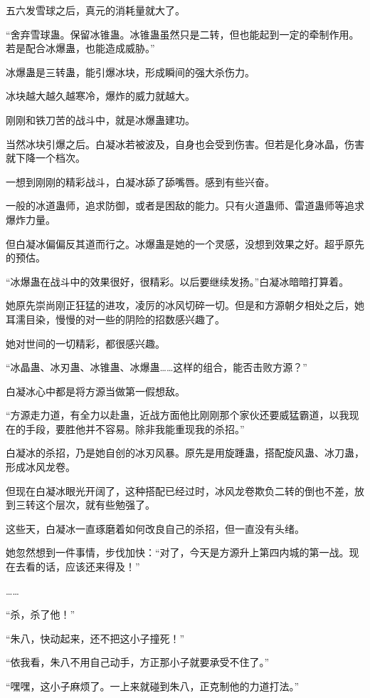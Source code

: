 \begin{this_body}
五六发雪球之后，真元的消耗量就大了。

“舍弃雪球蛊。保留冰锥蛊。冰锥蛊虽然只是二转，但也能起到一定的牵制作用。若是配合冰爆蛊，也能造成威胁。”

冰爆蛊是三转蛊，能引爆冰块，形成瞬间的强大杀伤力。

冰块越大越久越寒冷，爆炸的威力就越大。

刚刚和铁刀苦的战斗中，就是冰爆蛊建功。

当然冰块引爆之后。白凝冰若被波及，自身也会受到伤害。但若是化身冰晶，伤害就下降一个档次。

一想到刚刚的精彩战斗，白凝冰舔了舔嘴唇。感到有些兴奋。

一般的冰道蛊师，追求防御，或者是困敌的能力。只有火道蛊师、雷道蛊师等追求爆炸力量。

但白凝冰偏偏反其道而行之。冰爆蛊是她的一个灵感，没想到效果之好。超乎原先的预估。

“冰爆蛊在战斗中的效果很好，很精彩。以后要继续发扬。”白凝冰暗暗打算着。

她原先崇尚刚正狂猛的进攻，凌厉的冰风切碎一切。但是和方源朝夕相处之后，她耳濡目染，慢慢的对一些的阴险的招数感兴趣了。

她对世间的一切精彩，都很感兴趣。

“冰晶蛊、冰刃蛊、冰锥蛊、冰爆蛊……这样的组合，能否击败方源？”

白凝冰心中都是将方源当做第一假想敌。

“方源走力道，有全力以赴蛊，近战方面他比刚刚那个家伙还要威猛霸道，以我现在的手段，要胜他并不容易。除非我能重现我的杀招。”

白凝冰的杀招，乃是她自创的冰刃风暴。原先是用旋踵蛊，搭配旋风蛊、冰刀蛊，形成冰风龙卷。

但现在白凝冰眼光开阔了，这种搭配已经过时，冰风龙卷欺负二转的倒也不差，放到三转这个层次，就有些勉强了。

这些天，白凝冰一直琢磨着如何改良自己的杀招，但一直没有头绪。

她忽然想到一件事情，步伐加快：“对了，今天是方源升上第四内城的第一战。现在去看的话，应该还来得及！”

……

“杀，杀了他！”

“朱八，快动起来，还不把这小子撞死！”

“依我看，朱八不用自己动手，方正那小子就要承受不住了。”

“嘿嘿，这小子麻烦了。一上来就碰到朱八，正克制他的力道打法。”


\end{this_body}
